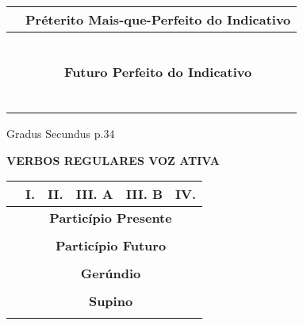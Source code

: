 \documentclass[12pt, oneside, a4paper, article]{article}
\begin{document}
\begin{table}[!hb]
\begin{tabular}{|l|p{2.5cm}|p{2.5cm}|p{2.5cm}|p{2.5cm}|p{2.5cm}|}
& \multicolumn{5}{c|}{\textbf{Préterito Mais-que-Perfeito do Indicativo}} \\
\hline
 &  &  &  &  &   \\ \hline
 &  &  &  &  &   \\ \hline
 &  &  &  &  &   \\ \hline
 &  &  &  &  &   \\ \hline
 &  &  &  &  &   \\ \hline
 &  &  &  &  &   \\ 
\hline \hline

& \multicolumn{5}{c|}{\textbf{Futuro Perfeito do Indicativo}} \\
\hline
 &  &  &  &  &   \\ \hline
 &  &  &  &  &   \\ \hline
 &  &  &  &  &   \\ \hline
 &  &  &  &  &   \\ \hline
 &  &  &  &  &   \\ \hline
 &  &  &  &  &   \\ 
\hline \hline

\end{tabular}
\end{table}

\clearpage
Gradus Secundus p.34

\begin{table}[!hb]
\centering
\textbf{VERBOS REGULARES VOZ ATIVA} 
\vspace{1 ex}

\begin{tabular}{|l|p{2.5cm}|p{2.5cm}|p{2.5cm}|p{2.5cm}|p{2.5cm}|} 
\hline \hline
& \multicolumn{1}{c|}{I.} & \multicolumn{1}{c|}{II.} & \multicolumn{1}{c|}{III. A} & \multicolumn{1}{c|}{III. B} & \multicolumn{1}{c|}{IV.}  \\
\hline

& \multicolumn{5}{c|}{\textbf{Particípio Presente}} \\
\hline
 &  &  &  &  &   \\ 
\hline \hline
& \multicolumn{5}{c|}{\textbf{Particípio Futuro}} \\
\hline
 &  &  &  &  &   \\ 
\hline \hline
& \multicolumn{5}{c|}{\textbf{Gerúndio}} \\
\hline
 &  &  &  &  &   \\ 
\hline \hline
& \multicolumn{5}{c|}{\textbf{Supino}} \\
\hline
 &  &  &  &  &   \\ 
\hline \hline

\end{tabular}
\end{table}
\end{document}
